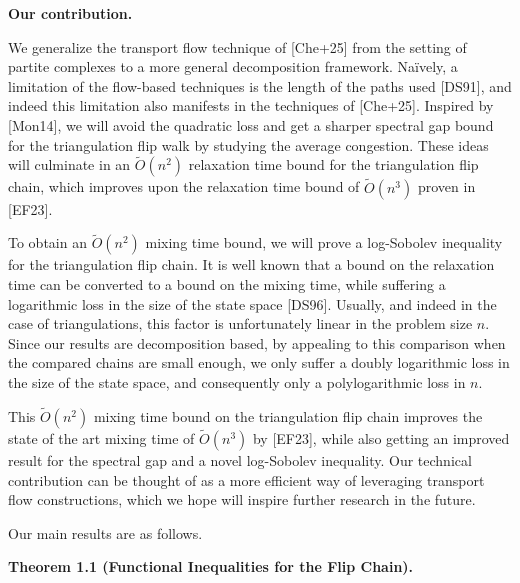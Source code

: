 \documentclass[10pt,a4paper]{article}
\begin{document}
\par\medskip\noindent\textbf{Our contribution.}\par




We generalize the transport flow technique of [Che+25] from the setting of partite complexes to a more general decomposition framework. Naïvely, a limitation of the flow-based techniques is the length of the paths used [DS91], and indeed this limitation also manifests in the techniques of [Che+25]. Inspired by [Mon14], we will avoid the quadratic loss and get a sharper spectral gap bound for the triangulation flip walk by studying the average congestion. These ideas will culminate in an $\widetilde{O}(n^{2})$ relaxation time bound for the triangulation flip chain, which improves upon the relaxation time bound of $\widetilde{O}(n^{3})$ proven in [EF23].\par




To obtain an $\widetilde{O}(n^{2})$ mixing time bound, we will prove a log-Sobolev inequality for the triangulation flip chain. It is well known that a bound on the relaxation time can be converted to a bound on the mixing time, while suffering a logarithmic loss in the size of the state space [DS96]. Usually, and indeed in the case of triangulations, this factor is unfortunately linear in the problem size $n$. Since our results are decomposition based, by appealing to this comparison when the compared chains are small enough, we only suffer a doubly logarithmic loss in the size of the state space, and consequently only a polylogarithmic loss in $n$.\par




This $\widetilde{O}(n^{2})$ mixing time bound on the triangulation flip chain improves the state of the art mixing time of $\widetilde{O}(n^{3})$ by [EF23], while also getting an improved result for the spectral gap and a novel log-Sobolev inequality. Our technical contribution can be thought of as a more efficient way of leveraging transport flow constructions, which we hope will inspire further research in the future.\par




Our main results are as follows.\par






\par\medskip\noindent\textbf{\textbf{Theorem 1.1}\textbf{ }(Functional Inequalities for the Flip Chain)\textbf{.}}\par
\end{document}
